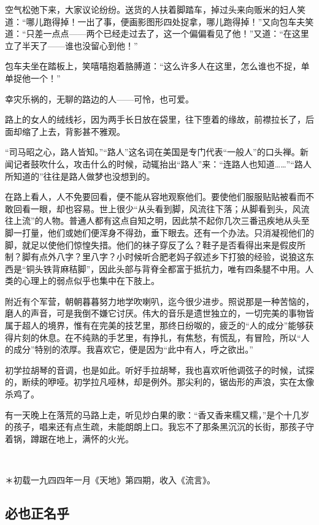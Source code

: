 \par 空气松弛下来，大家议论纷纷。送货的人扶着脚踏车，掉过头来向贩米的妇人笑道：“哪儿跑得掉！一出了事，便画影图形四处捉拿，哪儿跑得掉！”又向包车夫笑道：“只差一点点——两个已经走过去了，这一个偏偏看见了他！”又道：“在这里立了半天了——谁也没留心到他！”
\par 包车夫坐在踏板上，笑嘻嘻抱着胳膊道：“这么许多人在这里，怎么谁也不捉，单单捉他一个！”
\par 幸灾乐祸的，无聊的路边的人——可怜，也可爱。
\par 路上的女人的绒线衫，因为两手长日放在袋里，往下堕着的缘故，前襟拉长了，后面却缩了上去，背影甚不雅观。
\par “司马昭之心，路人皆知。”“路人”这名词在美国是专门代表“一般人”的口头禅。新闻记者鼓吹什么，攻击什么的时候，动辄抬出“路人”来：“连路人也知道……”“路人所知道的”往往是路人做梦也没想到的。
\par 在路上看人，人不免要回看，便不能从容地观察他们。要使他们服服贴贴被看而不敢回看一眼，却也容易。世上很少“从头看到脚，风流往下落；从脚看到头，风流往上流”的人物。普通人都有这点自知之明，因此禁不起你几次三番迅疾地从头至脚一打量，他们或她们便浑身不得劲，垂下眼去。还有一个办法。只消凝视他们的脚，就足以使他们惊惶失措。他们的袜子穿反了么？鞋子是否看得出来是假皮所制？脚有点外八字？里八字？小时候听合肥老妈子叙述乡下打狼的经验，说狼这东西是“铜头铁背麻秸脚”，因此头部与背脊全都富于抵抗力，唯有四条腿不中用。人类的心理上的弱点似乎也集中在下肢上。
\par 附近有个军营，朝朝暮暮努力地学吹喇叭，迄今很少进步。照说那是一种苦恼的，磨人的声音，可是我倒不嫌它讨厌。伟大的音乐是遗世独立的，一切完美的事物皆属于超人的境界，惟有在完美的技艺里，那终日纷呶的，疲乏的“人的成分”能够获得片刻的休息。在不纯熟的手艺里，有挣扎，有焦愁，有慌乱，有冒险，所以“人的成分”特别的浓厚。我喜欢它，便是因为“此中有人，呼之欲出。”
\par 初学拉胡琴的音调，也是如此。听好手拉胡琴，我也喜欢听他调弦子的时候，试探的，断续的咿哑。初学拉凡哑林，却是例外。那尖利的，锯齿形的声浪，实在太像杀鸡了。
\par 有一天晚上在落荒的马路上走，听见炒白果的歌：“香又香来糯又糯，”是个十几岁的孩子，唱来还有点生疏，未能朗朗上口。我忘不了那条黑沉沉的长街，那孩子守着锅，蹲踞在地上，满怀的火光。
\par  
\par ＊初载一九四四年一月《天地》第四期，收入《流言》。


\subsection{必也正名乎}

